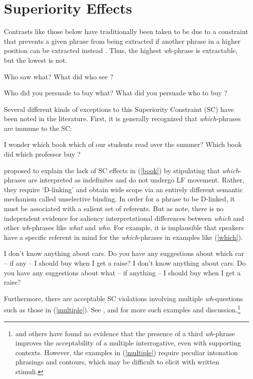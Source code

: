 \documentclass[output=paper]{langsci/langscibook}
\begin{document}
\section{Superiority Effects}

Contrasts like those below have traditionally been taken to be due to a constraint
that prevents a given phrase from being extracted if another phrase in a higher
position can be extracted instead \citep{chomsky73,chomsky80}. Thus, the highest {\it wh}-phrase
is extractable, but the lowest is not.

\ea
\ea Who \spcs saw what?
\ex \bad{*}What did who see \spc?
\z \label{badsc1}
\z

\ea
\ea Who did you persuade \spcs to buy what?
\ex \bad{*}What did you persuade who to buy \spc?
\z \label{badsc2}
\z

Several different kinds of exceptions to this Superiority Constraint (SC) have been 
noted in the literature. First, it is generally recognized that {\it which}-phrases are
immune to the SC:

\ea
\ea I wonder which book which of our students read \spc over the summer?
\ex Which book did which professor buy \spc?
\z \label{book}
\z

\noindent
 \citet{pesetskydlink} proposed to explain the lack of SC effects in (\ref{book}) 
by stipulating that  {\it which}-phrases are interpreted as indefinites and do not undergo LF movement. Rather, they require `D-linking' and obtain wide scope via an entirely different semantic mechanism called unselective binding. In order for a phrase to be D-linked, it must be associated with a salient set of referents. But as \citet[248ff.]{ginzsag} note, there is no independent evidence
for saliency interpretational differences between {\it which} and other {\it wh}-phrases like
{\it what} and {\it who}. For example, it is implausible that speakers have a specific referent
in mind for the {\it which}-phrases in examples like (\ref{which}).

\ea
\ea I don't know anything about cars. Do you have any suggestions about which car -- if any -- I should buy when I get a raise?
\ex I don't know anything about cars. Do you have any suggestions about what  -- if anything -- I should buy when I get a raise?\\
\citep[248]{ginzsag}
\z \label{which}
\z



Furthermore, there are acceptable SC violations involving multiple {\it wh}-questions such as those in (\ref{multiple}). See \citet{Bolinger78}, \citet{kayne83} and \citet[109]{pesetskydlink} for more
such examples and discussion.\footnote{\citet{gibson10} and others have found no evidence
that the presence of a third {\it wh}-phrase improves the acceptability of a multiple
interrogative, even with supporting contexts. However, the examples in (\ref{multiple}) 
require peculiar intonation phrasings and contours, which may be difficult to elicit with written stimuli.} 
\end{document}
